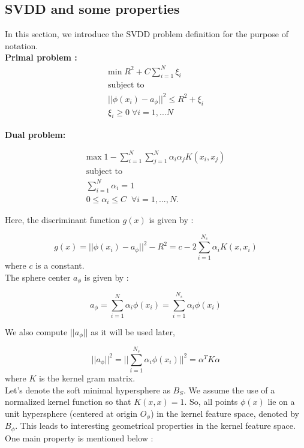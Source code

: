 \documentclass{article} %
\begin{document}
\subsection{SVDD and some properties}
In this section, we introduce the SVDD problem definition for the purpose of notation. \\[10pt]

\textbf{Primal problem :}
\begin{equation}
\begin{split}
\text{min} \; R^2 + C \sum\limits_{i=1}^N \xi_i \\
\text{subject to}\\
||\phi(x_i) - a_{\phi}||^2  \leq R^2 + \xi_i \\
\xi_i \geq 0 \; \forall i = 1,...N
\end{split}
\end{equation}

\textbf{Dual problem:}

\begin{equation}
\begin{split}
\text{max}\; 1 - \sum\limits_{i=1}^N \sum\limits_{j=1}^N \alpha_i \alpha_j K(x_i,x_j) \\
\text{subject to}  \\
\sum\limits_{i = 1}^N \alpha_i  = 1  \\
0 \leq \alpha_i \leq C \;\; \forall  i = 1,...,N.  
\end{split}
\end{equation}


Here, the discriminant function $g(x)$ is given by :

\[ g(x) = ||\phi(x_i) - a_{\phi}||^2 - R^2 = c - 2 \sum\limits_{i=1}^{N_s}\alpha_i K(x,x_i) \]
where $c$ is a constant. \\[10pt]

The sphere center $a_\phi$ is given by :

\[ a_\phi  = \sum\limits_{i=1}^{N} \alpha_i \phi(x_i) = \sum\limits_{i=1}^{N_s} \alpha_i \phi(x_i)\]

We also compute $||a_\phi||$ as it will be used later, 

\[||a_\phi||^2 = ||\sum\limits_{i=1}^{N_s} \alpha_i \phi(x_i) ||^2  = \alpha^T K \alpha\]
where $K$ is the kernel gram matrix. \\[10pt]


Let's denote the soft minimal hypersphere as $B_S$. We assume the use of a normalized kernel function so that $K(x,x) = 1$. So, all points $\phi(x)$ lie on a unit hypersphere (centered at origin $O_\phi$) in the kernel feature space, denoted by $B_\phi$. This leads to interesting geometrical properties in the kernel feature space. One main property is mentioned below : \\[10pt]
\end{document}
